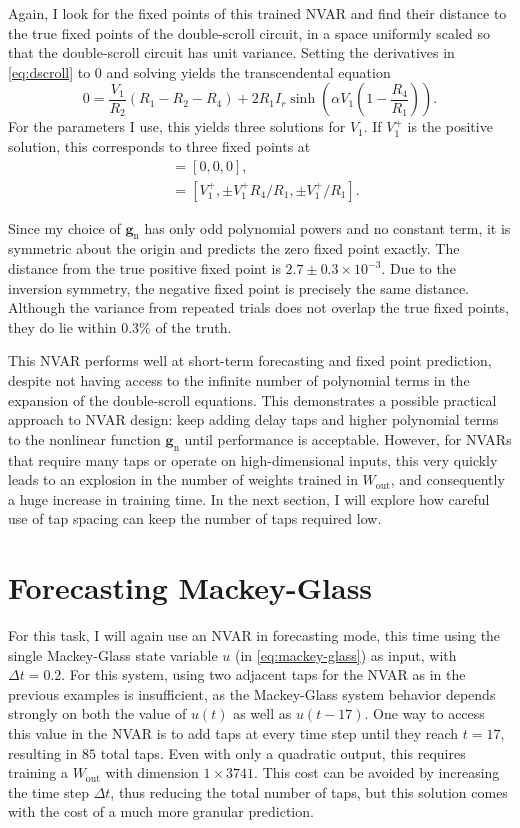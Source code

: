 Again, I look for the fixed points of this trained NVAR and find
their distance to the true fixed points of the double-scroll circuit,
in a space uniformly scaled so that the double-scroll circuit has unit
variance. Setting the derivatives in \cref{eq:dscroll} to $0$
and solving yields the transcendental equation
\begin{equation}
  0 = \frac{V_1}{R_2}(R_1 - R_2 - R_4) + 2 R_1 I_r \sinh\left(\alpha V_1 \left(1 - \frac{R_4}{R_1}\right)\right).
\end{equation}
For the parameters I use, this yields three solutions for $V_1$. If
$V_1^+$ is the positive solution, this corresponds to three fixed points
at
\begin{align}
  [V_1, V_2, I] &= [0, 0, 0], \\
                &= [V_1^+, \pm V_1^+ R_4 / R_1, \pm V_1^+ / R_1].
\end{align}

Since my choice of $\bm{g}_\text{n}$ has only odd polynomial powers
and no constant term, it is symmetric about the origin and predicts
the zero fixed point exactly. The distance from the true positive
fixed point is $2.7\pm0.3\times10^{-3}$. Due to the inversion
symmetry, the negative fixed point is precisely the same
distance. Although the variance from repeated trials does not overlap
the true fixed points, they do lie within $0.3\%$ of the truth.

This NVAR performs well at short-term forecasting and fixed point
prediction, despite not having access to the infinite number of
polynomial terms in the expansion of the double-scroll equations. This
demonstrates a possible practical approach to NVAR design: keep adding
delay taps and higher polynomial terms to the nonlinear function
$\bm{g}_\text{n}$ until performance is acceptable. However, for NVARs
that require many taps or operate on high-dimensional inputs, this
very quickly leads to an explosion in the number of weights trained in
$W_\text{out}$, and consequently a huge increase in training time. In
the next section, I will explore how careful use of tap spacing can
keep the number of taps required low.

\section{Forecasting Mackey-Glass}


For this task, I will again use an NVAR in forecasting mode, this time
using the single Mackey-Glass state variable $u$ (in
\cref{eq:mackey-glass}) as input, with $\Delta t = 0.2$. For this
system, using two adjacent taps for the NVAR as in the previous
examples is insufficient, as the Mackey-Glass system behavior depends
strongly on both the value of $u(t)$ as well as $u(t - 17)$. One way
to access this value in the NVAR is to add taps at every time step
until they reach $t = 17$, resulting in $85$ total taps. Even with only a
quadratic output, this requires training a $W_\text{out}$ with
dimension $1 \times 3741$. This cost can be avoided by increasing the
time step $\Delta t$, thus reducing the total number of taps, but this
solution comes with the cost of a much more granular prediction.

